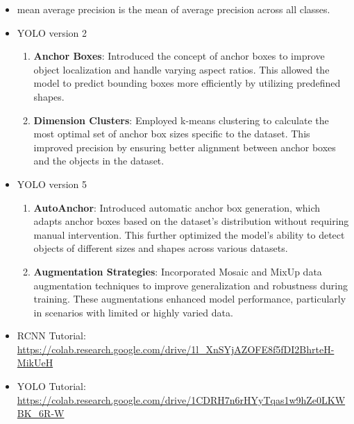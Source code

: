 \documentclass[a4paper]{article}
\begin{document}
\begin{itemize}
    \item mean average precision is the mean of average precision across all classes.
    \item YOLO version 2
    \begin{enumerate}
        \item \textbf{Anchor Boxes}: Introduced the concept of anchor boxes to improve object localization and handle varying aspect ratios. This allowed the model to predict bounding boxes more efficiently by utilizing predefined shapes.
        \item \textbf{Dimension Clusters}: Employed k-means clustering to calculate the most optimal set of anchor box sizes specific to the dataset. This improved precision by ensuring better alignment between anchor boxes and the objects in the dataset.
    \end{enumerate}
    \item YOLO version 5
    \begin{enumerate}
        \item \textbf{AutoAnchor}: Introduced automatic anchor box generation, which adapts anchor boxes based on the dataset's distribution without requiring manual intervention. This further optimized the model's ability to detect objects of different sizes and shapes across various datasets.
        \item \textbf{Augmentation Strategies}: Incorporated Mosaic and MixUp data augmentation techniques to improve generalization and robustness during training. These augmentations enhanced model performance, particularly in scenarios with limited or highly varied data.
    \end{enumerate}
    \item RCNN Tutorial: \url{https://colab.research.google.com/drive/1l_XnSYjAZOFE8f5fDI2BhrteH-MikUeH}
    \item YOLO Tutorial: \url{https://colab.research.google.com/drive/1CDRH7n6rHYyTqas1w9hZe0LKWBK_6R-W}
\end{itemize}
\end{document}
